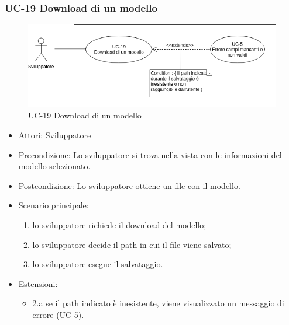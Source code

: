 	\subsubsection{UC-19 Download di un modello}
		\begin{figure}[h]
			\centering
			\includegraphics[scale=0.7]{images/UC-19.png}
			\caption{UC-19 Download di un modello}
		\end{figure}			
		\begin{itemize}
			\item Attori: Sviluppatore
			\item Precondizione: Lo sviluppatore si trova nella vista con le informazioni del modello selezionato.
			\item Postcondizione: Lo sviluppatore ottiene un file con il modello.
			\item Scenario principale:
			\begin{enumerate}
					\item lo sviluppatore richiede il download del modello;
					\item lo sviluppatore decide il path in cui il file viene salvato;
					\item lo sviluppatore esegue il salvataggio.
				\end{enumerate}
			\item Estensioni:
				\begin{itemize}
					\item 2.a se il path indicato è inesistente, viene visualizzato un messaggio di errore (UC-5).
				\end{itemize}
		\end{itemize}
		
